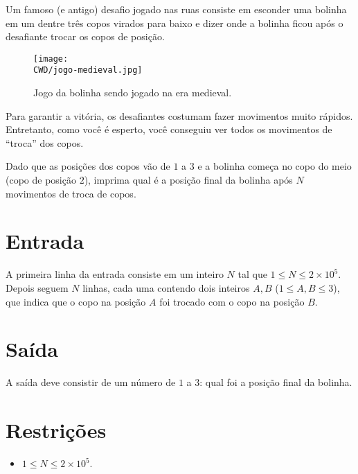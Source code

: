 %

Um famoso (e antigo) desafio jogado nas ruas consiste em esconder uma bolinha em um dentre três copos virados para baixo e dizer onde a bolinha ficou após o desafiante trocar os copos de posição.

\begin{figure}[H]
  \centering
  \texttt{[image: \\CWD/jogo-medieval.jpg]}
  \caption{Jogo da bolinha sendo jogado na era medieval.}
\end{figure}

Para garantir a vitória, os desafiantes costumam fazer movimentos muito rápidos. Entretanto, como você é esperto, você conseguiu ver todos os movimentos de ``troca'' dos copos. 

Dado que as posições dos copos vão de $1$ a $3$ e a bolinha começa no copo do meio (copo de posição $2$), imprima qual é a posição final da bolinha após $N$ movimentos de troca de copos.


%
%

\section*{Entrada}

A primeira linha da entrada consiste em um inteiro $N$ tal que $1 \leq N \leq 2\times10^5$. Depois seguem $N$ linhas, cada uma contendo dois inteiros $A, B$ ($1 \leq A, B \leq 3$), que indica que o copo na posição $A$ foi trocado com o copo na posição $B$.


%
%

\section*{Saída}

A saída deve consistir de um número de $1$ a $3$: qual foi a posição final da bolinha.

\section*{Restrições}

\begin{itemize}
\item $1 \leq N \leq 2\times 10^5$.
\end{itemize}


\exemplo
